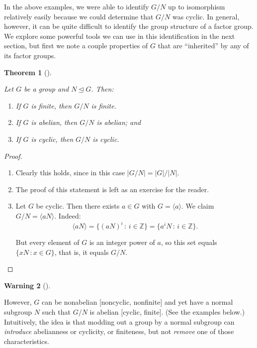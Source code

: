 \documentclass[10pt,]{book}
\theoremstyle{plain}
\newtheorem{theorem}{Theorem}[section]
\theoremstyle{definition}
\theoremstyle{definition}
\newtheorem{warning}[theorem]{Warning}
\theoremstyle{definition}
\theoremstyle{definition}
\numberwithin{equation}{section}
\def\Z{\mathbb{Z}}
\begin{document}
    In the above examples, we were able to identify \(G/N\) up to
    isomorphism relatively easily because we could determine that \(G/N\)
    was cyclic. In general, however, it can be quite difficult to
    identify the group structure of a factor group. We explore some
    powerful tools we can use in this identification in the next
    section, but first we note a couple properties of \(G\) that are
    ``inherited'' by any of its factor groups.
\begin{theorem}[{}]\label{theorem-53}

        Let \(G\) be a group and \(N\unlhd G\). Then:
        \leavevmode%
\begin{enumerate}
\item\hypertarget{li-500}{}
              If \(G\) is finite, then \(G/N\) is finite.
\item\hypertarget{li-501}{}
              If \(G\) is abelian, then \(G/N\) is abelian; and
\item\hypertarget{li-502}{}
              If \(G\) is cyclic, then \(G/N\) is cyclic.
\end{enumerate}

\end{theorem}
\begin{proof}\hypertarget{proof-48}{}
\leavevmode%
\begin{enumerate}
\item\hypertarget{li-503}{}
          Clearly this holds, since in this case
          \(|G/N|=|G|/|N|\).
\item\hypertarget{li-504}{}
          The proof of this statement is left as an exercise for the reader.
\item\hypertarget{li-505}{}
          Let \(G\) be cyclic.  Then there exists \(a\in G\) with \(G=\langle a\rangle\).  We claim \(G/N=\langle aN\rangle\). Indeed:
\begin{equation*}

            \langle aN\rangle =\{(aN)^i\,:\,i\in \Z\}=\{a^iN\,:\,i\in \Z\}.
          
\end{equation*}

          But every element of \(G\) is an integer power of \(a\), so this set equals \(\{xN\,:x\in G\}\), that is, it equals \(G/N\).
%
\end{enumerate}
\end{proof}
\begin{warning}[]\label{warning-21}

      However, \(G\) can be nonabelian [noncyclic, nonfinite] and
      yet have a normal subgroup \(N\) such that \(G/N\) is abelian [cyclic,
      finite]. (See the examples below.) Intuitively, the idea is that
      modding out a group by a normal subgroup can \emph{introduce}
      abelianness or cyclicity, or finiteness, but not \emph{remove}
      one of those characteristics.
\end{warning}
\end{document}
